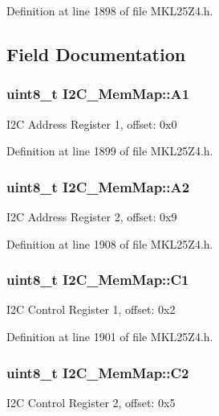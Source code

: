 Definition at line 1898 of file M\+K\+L25\+Z4.\+h.



\subsection{Field Documentation}
\subsubsection[{\texorpdfstring{A1}{A1}}]{\setlength{\rightskip}{0pt plus 5cm}uint8\+\_\+t I2\+C\+\_\+\+Mem\+Map\+::\+A1}\hypertarget{struct_i2_c___mem_map_aefc602e5555ff9807f66ba8d67c214c0}{}\label{struct_i2_c___mem_map_aefc602e5555ff9807f66ba8d67c214c0}
I2C Address Register 1, offset\+: 0x0 

Definition at line 1899 of file M\+K\+L25\+Z4.\+h.

\subsubsection[{\texorpdfstring{A2}{A2}}]{\setlength{\rightskip}{0pt plus 5cm}uint8\+\_\+t I2\+C\+\_\+\+Mem\+Map\+::\+A2}\hypertarget{struct_i2_c___mem_map_ad4e4dbcd884a2b52af7dbef17817f12e}{}\label{struct_i2_c___mem_map_ad4e4dbcd884a2b52af7dbef17817f12e}
I2C Address Register 2, offset\+: 0x9 

Definition at line 1908 of file M\+K\+L25\+Z4.\+h.

\subsubsection[{\texorpdfstring{C1}{C1}}]{\setlength{\rightskip}{0pt plus 5cm}uint8\+\_\+t I2\+C\+\_\+\+Mem\+Map\+::\+C1}\hypertarget{struct_i2_c___mem_map_a211af10ff66759da8bd2712f3d26ad8a}{}\label{struct_i2_c___mem_map_a211af10ff66759da8bd2712f3d26ad8a}
I2C Control Register 1, offset\+: 0x2 

Definition at line 1901 of file M\+K\+L25\+Z4.\+h.

\subsubsection[{\texorpdfstring{C2}{C2}}]{\setlength{\rightskip}{0pt plus 5cm}uint8\+\_\+t I2\+C\+\_\+\+Mem\+Map\+::\+C2}\hypertarget{struct_i2_c___mem_map_a5e8189de70defa55b4d4d50e42ac88d1}{}\label{struct_i2_c___mem_map_a5e8189de70defa55b4d4d50e42ac88d1}
I2C Control Register 2, offset\+: 0x5 

